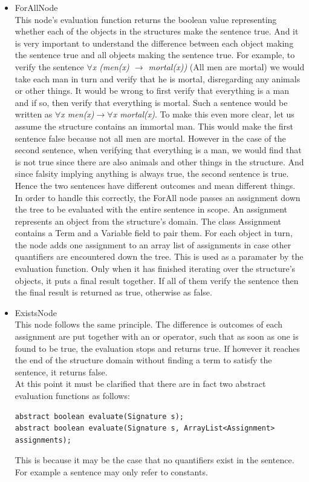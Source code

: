 \documentclass{report}
\begin{document}
\begin{itemize}
\item ForAllNode\\
This node's evaluation function returns the boolean value representing whether 
each of the objects in the structures make the sentence true. And it is very 
important to understand the difference between each object making the sentence 
true and all objects making the sentence true. For example, to verify the 
sentence \emph{$\forall$x (men(x) $\rightarrow$ mortal(x))} (All men are mortal) 
we would take each man in turn and verify that he is mortal, disregarding any 
animals or other things. It would be wrong to first verify that everything is a 
man and if so, then verify that everything is mortal. Such a sentence would be 
written as \emph{$\forall$x men(x)$ \rightarrow \forall$x mortal(x)}. To make 
this even more clear, let us assume the structure contains an immortal man. 
This would make the first sentence false because not all men are mortal. However 
in the case of the second sentence, when verifying that everything is a man, we 
would find that is not true since there are also animals and other things in the 
structure. And since falsity implying anything is always true, the second 
sentence is true. Hence the two sentences have different outcomes and mean 
different things. \\
In order to handle this correctly, the ForAll node passes an assignment down 
the tree to be evaluated with the entire sentence in scope. An assignment 
represents an object from the structure's domain. The class Assignment contains 
a Term and a Variable field to pair them. For each object in turn, the node adds 
one assignment to an array list of assignments in case other quantifiers are 
encountered down the tree. This is used as a paramater by the evaluation 
function. Only when it has finished iterating over the structure's objects, 
it puts a final result together. If all of them verify the sentence then the 
final result is returned as true, otherwise as false. 

\item ExistsNode\\
This node follows the same principle. The difference is outcomes of each 
assignment are put together with an or operator, such that as soon as one is 
found to be true, the evaluation stops and returns true. If however it reaches 
the end of the structure domain without finding a term to satisfy the sentence, 
it returns false.\\
At this point it must be clarified that there are in fact two abstract 
evaluation functions as follows:
\begin{verbatim}
abstract boolean evaluate(Signature s);
abstract boolean evaluate(Signature s, ArrayList<Assignment> assignments);
\end{verbatim}
This is because it may be the case that no quantifiers exist in the sentence. 
For example a sentence may only refer to constants.


\end{itemize}
\end{document}
